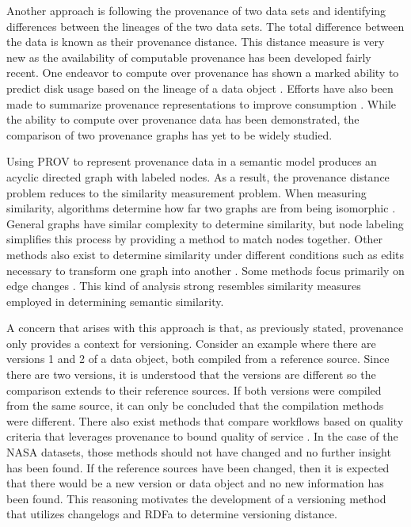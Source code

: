 Another approach is following the provenance of two data sets and identifying  differences between the lineages of the two data sets.
The total difference between the data is known as their provenance distance.
This distance measure is very new as the availability of computable provenance has been developed fairly recent.
One endeavor to compute over provenance has shown a marked ability to predict disk usage based on the lineage of a data object \cite{dai2014provenance}.
Efforts have also been made to summarize provenance representations to improve consumption \cite{Ainy:2015:ASD:2806416.2806429}.
While the ability to compute over provenance data has been demonstrated, the comparison of two provenance graphs has yet to be widely studied.

Using PROV to represent provenance data in a semantic model produces an acyclic directed graph with labeled nodes.
As a result, the provenance distance problem reduces to the similarity measurement problem.
When measuring similarity, algorithms determine how far two graphs are from being isomorphic \cite{Cao2013}.
General graphs have similar complexity to determine similarity, but node labeling simplifies this process by providing a method to match nodes together.
Other methods also exist to determine similarity under different conditions such as edits necessary to transform one graph into another  \cite{Gao2010}.
Some methods focus primarily on edge changes \cite{Goddard:1996:DGU:246962.246972}.
This kind of analysis strong resembles similarity measures employed in determining semantic similarity.


A concern that arises with this approach is that, as previously stated, provenance only provides a context for versioning.
Consider an example where there are versions 1 and 2 of a data object, both compiled from a reference source.
Since there are two versions, it is understood that the versions are different so the comparison extends to their reference sources.
If both versions were compiled from the same source, it can only be concluded that the compilation methods were different.
There also exist methods that compare workflows based on quality criteria that leverages provenance to bound quality of service \cite{2015:CAA:2778374.2778504}.
In the case of the NASA datasets, those methods should not have changed and no further insight has been found.
If the reference sources have been changed, then it is expected that there would be a new version or data object and no new information has been found.
This reasoning motivates the development of a versioning method that utilizes changelogs and RDFa to determine versioning distance.

